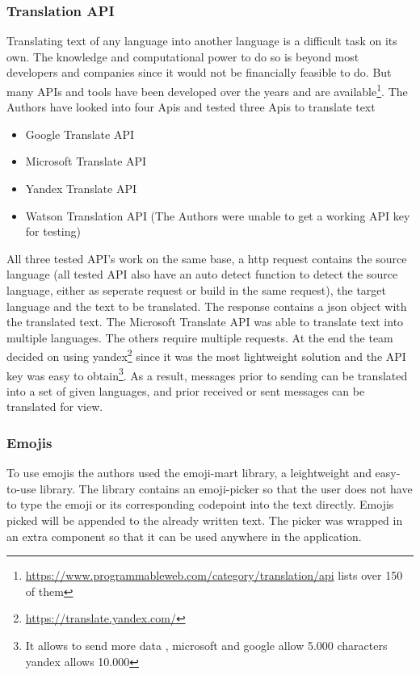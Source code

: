 \setcounter{footnote}{0}
\subsubsection{Translation API}
Translating text of any language into another language is a difficult task on its own. The knowledge and computational power to do so is beyond most developers and companies since it would not be financially feasible to do. But many APIs and tools have been developed over the years and are available\footnote{\url{https://www.programmableweb.com/category/translation/api} lists over 150 of them}. The Authors have looked into four Apis and tested three Apis to translate text
\begin{itemize}
	\item Google Translate API 
	\item Microsoft Translate API
	\item Yandex Translate API
	\item Watson Translation API (The Authors were unable to get a working API key for testing)
\end{itemize}

All three tested API’s work on the same base, a http request contains the source language (all tested API also have an auto detect function to detect the source language, either as seperate request or build in the same request), the target language and the text to be translated. The response contains a json object with the translated text. The Microsoft Translate API was able to translate text into multiple languages. The others require multiple requests. At the end the team decided on using yandex\footnote{\url{https://translate.yandex.com/}} since it was the most lightweight solution and the API key was easy to obtain\footnote{It allows to send more data , microsoft and google allow 5.000 characters yandex allows 10.000}.
As a result, messages prior to sending can be translated into a set of given languages, and prior received or sent messages can be translated for view.
\subsubsection{Emojis}
To use emojis the authors used the emoji-mart library, a leightweight and easy-to-use library. The library contains an emoji-picker so that the user does not have to type the emoji or its corresponding codepoint into the text directly. Emojis picked will be appended to the already written text. The picker was wrapped in an extra component so that it can be used anywhere in the application.

